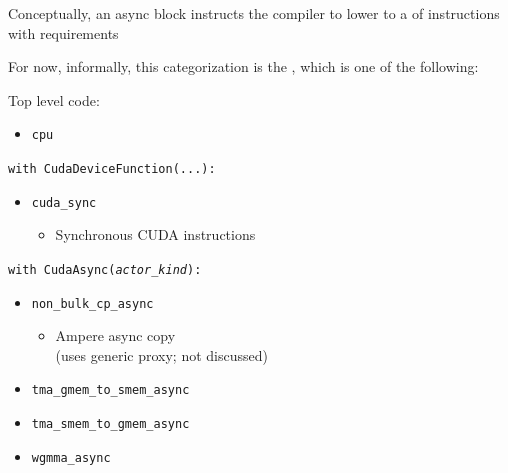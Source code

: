 \begin{minipage}[t]{0.48\textwidth}\fixminipage
Conceptually, an async block instructs the compiler to lower to a  of instructions with  requirements

For now, informally, this categorization is the , which is one of the following:

\vspace{12mm}

Top level code:
\begin{itemize}
  \item \texttt{cpu}
\end{itemize}

\texttt{with CudaDeviceFunction(...):}
\begin{itemize}
  \item \texttt{cuda\_sync}
  \begin{itemize}
    \item Synchronous CUDA instructions
  \end{itemize}
\end{itemize}

\texttt{with CudaAsync(\textit{actor\_kind}):}
\begin{itemize}
  \item \texttt{non\_bulk\_cp\_async}
  \begin{itemize}
    \item Ampere async copy\\(uses generic proxy; not discussed)
  \end{itemize}
  \item \texttt{tma\_gmem\_to\_smem\_async}
  \item \texttt{tma\_smem\_to\_gmem\_async}
  \item \texttt{wgmma\_async}
\end{itemize}
\end{minipage}
\hfill
